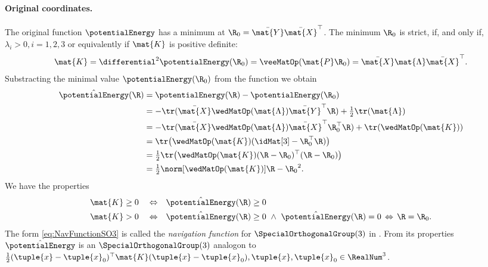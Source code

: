 \paragraph{Original coordinates.}
The original function $\potentialEnergy$ has a minimum at $\R_0 = \bar{\mat{Y}} \bar{\mat{X}}^\top$.
The minimum $\R_0$ is strict, if, and only if, $\lambda_i > 0, i=1,2,3$ or equivalently if $\mat{K}$ is positive definite:
\begin{align}
 \mat{K} = \differential^2 \potentialEnergy (\R_0) = \veeMatOp(\mat{P}\R_0) = \bar{\mat{X}} \mat{\Lambda} \bar{\mat{X}}^\top.
\end{align}
Substracting the minimal value $\potentialEnergy(\R_0)$ from the function we obtain
\begin{subequations}
\begin{align}
 \hat{\potentialEnergy}(\R) &= \potentialEnergy(\R) - \potentialEnergy(\R_0)
\nonumber\\
 &= -\tr(\bar{\mat{X}} \wedMatOp(\mat{\Lambda}) \bar{\mat{Y}}^\top \R) + \tfrac{1}{2}\tr(\mat{\Lambda})
\nonumber\\
 &= -\tr(\bar{\mat{X}} \wedMatOp(\mat{\Lambda}) \bar{\mat{X}}^\top \R_0^\top \R) + \tr(\wedMatOp(\mat{K}))
\nonumber\\
\label{eq:NavFunctionSO3}
 &= \tr\big(\wedMatOp(\mat{K})(\idMat[3] - \R_0^\top \R)\big)
\\
 &= \tfrac{1}{2} \tr\big(\wedMatOp(\mat{K})(\R - \R_0)^\top (\R - \R_0)\big)
\nonumber\\
 &= \tfrac{1}{2}\norm[\wedMatOp(\mat{K})]{\R-\R_0}^2.
\end{align}
\end{subequations}
We have the properties
\begin{subequations}
\begin{align}
 \mat{K} &\geq 0& 
 &\Leftrightarrow&
 \hat{\potentialEnergy}(\R) &\geq 0
\\
 \mat{K} &> 0& 
 &\Leftrightarrow&
 \hat{\potentialEnergy}(\R) &\geq 0 \ \wedge \ \hat{\potentialEnergy}(\R) = 0 \, \Leftrightarrow \, \R = \R_0.
\end{align}
\end{subequations}
The form \eqref{eq:NavFunctionSO3} is called the \textit{navigation function} for $\SpecialOrthogonalGroup(3)$ in \cite{Koditschek:TotalEnergy}.
From its properties $\hat{\potentialEnergy}$ is an $\SpecialOrthogonalGroup(3)$ analogon to $\tfrac{1}{2}(\tuple{x}-\tuple{x}_0)^\top\mat{K}(\tuple{x}-\tuple{x}_0), \tuple{x},\tuple{x}_0\in\RealNum^3$.


